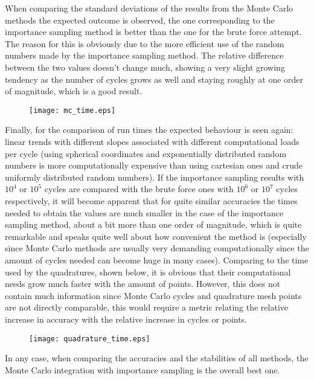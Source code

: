 \documentclass[11pt,a4paper,oneside]{article}
\begin{document}
		When comparing the standard deviations of the results from the Monte Carlo methods the expected outcome is observed, the one corresponding to the importance sampling method is better than the one for the brute force attempt. The reason for this is obviously due to the more efficient use of the random numbers made by the importance sampling method. The relative difference between the two values doesn't change much, showing a very slight growing tendency as the number of cycles grows as well and staying roughly at one order of magnitude, which is a good result.\\
		
		\begin{figure}[ht!]\begin{center}\texttt{[image: mc\_time.eps]}\par\end{center}\protect\end{figure}
		
		Finally, for the comparison of run times the expected behaviour is seen again: linear trends with different slopes associated with different computational loads per cycle (using spherical coordinates and exponentially distributed random numbers is more computationally expensive than using cartesian ones and crude uniformly distributed random numbers). If the importance sampling results with $10^4$ or $10^5$ cycles are compared with the brute force ones with $10^6$ or $10^7$ cycles respectively, it will become apparent that for quite similar accuracies the times needed to obtain the values are much smaller in the case of the importance sampling method, about a bit more than one order of magnitude, which is quite remarkable and speaks quite well about how convenient the method is (especially since Monte Carlo methods are usually very demanding computationally since the amount of cycles needed can become huge in many cases). Comparing to the time used by the quadratures, shown below, it is obvious that their computational needs grow much faster with the amount of points. However, this does not contain much information since Monte Carlo cycles and quadrature mesh points are not directly comparable, this would require a metric relating the relative increase in accuracy with the relative increase in cycles or points.\\
		
		\begin{figure}[ht!]\begin{center}\texttt{[image: quadrature\_time.eps]}\par\end{center}\protect\end{figure}
		
		In any case, when comparing the accuracies and the stabilities of all methods, the Monte Carlo integration with importance sampling is the overall best one.
		
\end{document}
